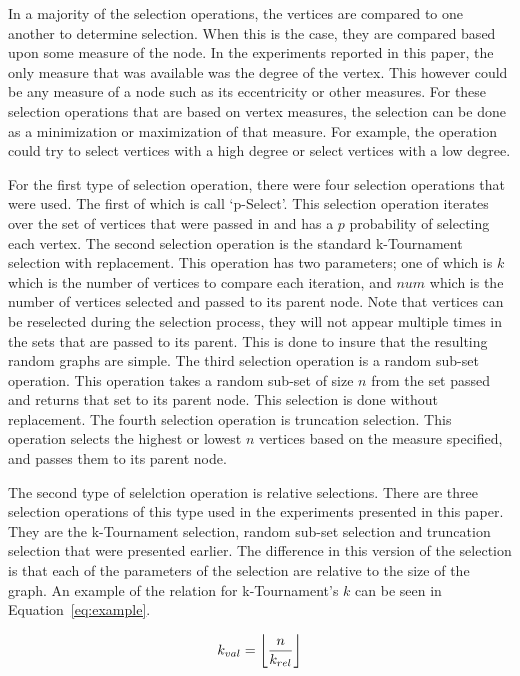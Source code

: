 \documentclass{article}
\DeclarePairedDelimiter\floor{\lfloor}{\rfloor}
\begin{document}
In a majority of the selection operations, the vertices are compared to one another to determine selection. When this is the case, 
they are compared based upon some measure of the node. In the experiments reported in this paper, the only measure that was available
was the degree of the vertex. This however could be any measure of a node such as its eccentricity or other measures. For these
selection operations that are based on vertex measures, the selection can be done as a minimization or maximization of that measure. For
example, the operation could try to select vertices with a high degree or select vertices with a low degree.

For the first type of selection operation, there were four selection operations that were used. The first of which is call `p-Select'.
This selection operation iterates over the set of vertices that were passed in and has a $p$ probability of selecting each vertex. The
second selection operation is the standard k-Tournament selection with replacement. This operation has two parameters; one of which is $k$ which
is the number of vertices to compare each iteration, and $num$ which is the number of vertices selected and passed to its parent node. Note that 
vertices can be reselected during the selection process, they will not appear multiple times in the sets that are passed to its parent. This 
is done to insure that the resulting random graphs are simple. The third selection operation is a random sub-set operation. This operation takes 
a random sub-set of size $n$ from the set passed and returns that set to its parent node. This selection is done without replacement. The fourth 
selection operation is truncation selection. This operation selects the highest or lowest $n$ vertices based on the measure specified, and passes
them to its parent node.

The second type of selelction operation is relative selections. There are three selection operations of this type used in the experiments presented
in this paper. They are the k-Tournament selection, random sub-set selection and truncation selection that were presented earlier. The difference
in this version of the selection is that each of the parameters of the selection are relative to the size of the graph. An example of the
relation for k-Tournament's $k$ can be seen in Equation~\ref{eq:example}.

\begin{equation}
\label{eq:example}
k_{val} = \floor*{\frac{n}{k_{rel}}}
\end{equation}
\end{document}
